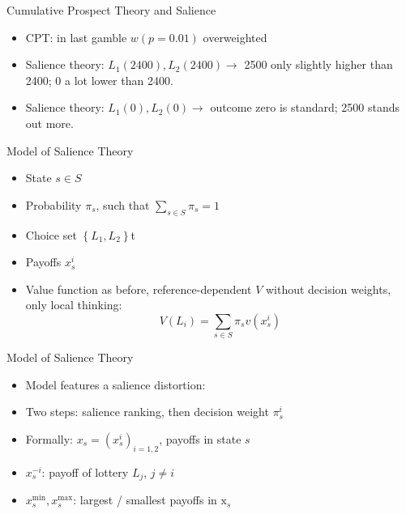 \begin{frame}{Cumulative Prospect Theory and Salience}
\begin{itemize}
    \item CPT: in last gamble $w(p=0.01)$ overweighted\medskip
    \item Salience theory: $L_1(2400),L_2(2400) \rightarrow$ 2500 only slightly higher than 2400; 0 a lot lower than 2400.\medskip
    \item Salience theory: $L_1(0),L_2(0) \rightarrow$ outcome zero is standard; 2500 stands out more.\medskip
\end{itemize}
\end{frame}

\begin{frame}{Model of Salience Theory}
    \begin{itemize}
        \item State $s \in S$\medskip
        \item Probability $\pi_s$, such that $\sum_{s \in S} \pi_s=1$\medskip
        \item Choice set $\left\{L_1, L_2\right\}$t\medskip
        \item Payoffs $x_s^i$\medskip
        \item Value function as before, reference-dependent $V$ without decision weights, only local thinking:
        \[    V\left(L_i\right)=\sum_{s \in S} \pi_s v\left(x_s^i\right)\]
     	\end{itemize}
\end{frame}

\begin{frame}{Model of Salience Theory}
    \begin{itemize}
	\item Model features a salience distortion:\medskip
        \item Two steps: salience ranking, then decision weight $\pi_s^i$\medskip
        \item Formally: $x_s=\left(x_s^i\right)_{i=1,2}$, payoffs in state $s$\medskip
        \item $x_s^{-i}$: payoff of lottery $L_j$, $j \neq i$\medskip
        \item $x_s^{\min }, x_s^{\max }$: largest / smallest payoffs in $\mathrm{x}_s$
	\end{itemize}
\end{frame}


